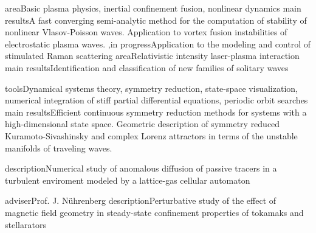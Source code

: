 \documentclass[11pt,a4paper,final]{moderncv}
\begin{document}
		{area}{Basic plasma physics, inertial confinement fusion, nonlinear dynamics}
		{main results}{A fast converging semi-analytic method for the computation of stability of nonlinear {Vlasov-Poisson} waves.
				Application to vortex fusion instabilities of electrostatic plasma waves.}
		{\sep in progress}{Application to the modeling and control of stimulated Raman scattering}
		{area}{Relativistic intensity laser-plasma interaction}
		{main results}{Identification and classification of new families of solitary waves}{}{}

		{tools}{Dynamical systems theory, symmetry reduction, state-space visualization, numerical integration of stiff partial differential equations, periodic orbit searches}
		{main results}{Efficient continuous symmetry reduction methods for systems with a high-dimensional state space.
				Geometric description of symmetry reduced Kuramoto-Sivashinsky and complex Lorenz attractors
				in terms of the unstable manifolds of traveling waves.
				}

{description}{Numerical study of anomalous diffusion of passive tracers in a turbulent enviroment modeled by
	      a lattice-gas cellular automaton}

{adviser}{Prof. J. N\"{u}hrenberg}
{description}{Perturbative study of the effect of magnetic field geometry in steady-state confinement
	      properties of tokamaks and stellarators}
\end{document}
